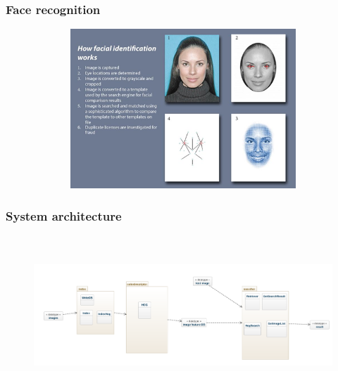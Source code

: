\documentclass{beamer}
\begin{document}
	\begin{frame}
		\frametitle{Face recognition}
			\begin{figure}[H]
			\centering
			\includegraphics[width=120mm,height=60mm]{fig/30.png}
		\end{figure}
	\end{frame}
\begin{frame}
	\frametitle{System architecture}
		\begin{figure}[H]
		\centering
		\includegraphics[width=120mm,height=60mm]{fig/22.png}
	\end{figure}
\end{frame}
\end{document}

